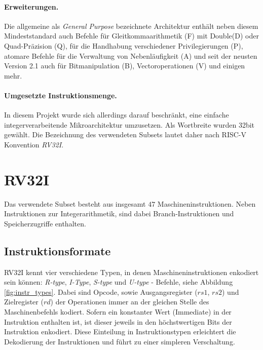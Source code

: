 \paragraph{Erweiterungen.} Die allgemeine als \textit{General Purpose} bezeichnete Architektur enthält neben diesem Mindeststandard auch Befehle für Gleitkommaarithmetik (F) mit Double(D) oder Quad-Präzision (Q), für die Handhabung verschiedener Privilegierungen (P), atomare Befehle für die Verwaltung von Nebenläufigkeit (A) und seit der neusten Version 2.1 auch für Bitmanipulation (B), Vectoroperationen (V) und einigen mehr. \cite[p. 4f.]{RISC}

\paragraph{Umgesetzte Instruktionsmenge.} In diesem Projekt wurde sich allerdings darauf beschränkt, eine einfache integerverarbeitende Mikroarchitektur umzusetzen. Als Wortbreite wurden 32bit gewählt. Die Bezeichnung des verwendeten Subsets lautet daher nach RISC-V Konvention \textit{RV32I}. \cite[p. 67ff.]{RISC}

\section{RV32I}
Das verwendete Subset besteht aus insgesamt $47$ Maschineninstruktionen. Neben Instruktionen zur Integerarithmetik, sind dabei Branch-Instruktionen und Speicherzugriffe enthalten.

\subsection{Instruktionsformate}
RV32I kennt vier verschiedene Typen, in denen Maschineninstruktionen enkodiert sein können: \textit{R-type}, \textit{I-Type}, \textit{S-type} und \textit{U-type} - Befehle, siehe Abbildung \ref{fig:instr_types}. Dabei sind Opcode, sowie Ausgangsregister ($rs1$, $rs2$) und Zielregister ($rd$) der Operationen immer an der gleichen Stelle des Maschinenbefehls kodiert. Sofern ein konstanter Wert (Immediate) in der Instruktion enthalten ist, ist dieser jeweils in den höchstwertigen Bits der Instruktion enkodiert. Diese Einteilung in Instruktionstypen erleichtert die Dekodierung der Instruktionen und führt zu einer simpleren Verschaltung.

